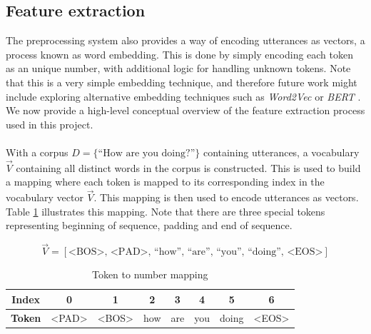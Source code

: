 \documentclass{article}
\begin{document}
\subsection*{Feature extraction}
The preprocessing system also provides a way of encoding utterances as
vectors, a process known as word embedding. This is done by simply
encoding each token as an unique number, with additional logic for handling
unknown tokens. Note that this is a very simple embedding technique, and
therefore future work might include exploring alternative embedding techniques
such as \emph{Word2Vec} \cite{word2vec} or \emph{BERT} \cite{bert2018}.
We now provide a high-level conceptual overview of the feature extraction
process used in this project.

\paragraph{}
With a corpus $D = \{\text{``How are you doing?''}\}$ containing utterances, 
a vocabulary $\vec{V}$ containing all distinct words in the corpus is
constructed. This is used to build a mapping where each token is mapped to
its corresponding index in the vocabulary vector $\vec{V}$. This mapping is
then used to encode utterances as vectors. Table \ref{tab:tok2num} illustrates
this mapping. Note that there are three special tokens representing beginning
of sequence, padding and end of sequence.

\begin{equation}
   \vec{V} = [ \textrm{<BOS>},\, \textrm{<PAD>},\, \textrm{``how''},\,
               \textrm{``are''},\, \textrm{``you''},\, \textrm{``doing''},\,
               \textrm{<EOS>}]
 \end{equation}

\begin{table}[hbt]
  \begin{center}
    \begin{tabular}{c|c|c|c|c|c|c|c}
      \textbf{Index} & 0 & 1 & 2 & 3 & 4 & 5 & 6 \\
      \hline
      \textbf{Token} & <PAD> & <BOS> & how & are & you & doing & <EOS> \\
    \end{tabular}
  \end{center}
  \label{tab:tok2num}
  \caption{Token to number mapping}
\end{table}
\end{document}
